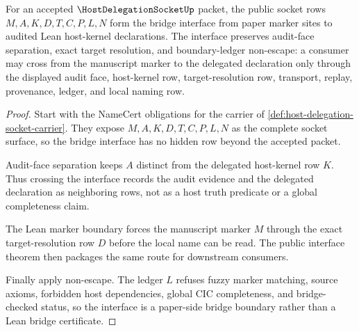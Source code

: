 \begin{theorem}
\label{thm:host-delegation-socket-bridge-interface}
For an accepted $\HostDelegationSocketUp$ packet, the public socket rows $M,A,K,D,T,C,P,L,N$ form the bridge interface from paper marker sites to audited Lean host-kernel declarations. The interface preserves audit-face separation, exact target resolution, and boundary-ledger non-escape: a consumer may cross from the manuscript marker to the delegated declaration only through the displayed audit face, host-kernel row, target-resolution row, transport, replay, provenance, ledger, and local naming row.
\end{theorem}
\begin{proof}
Start with the NameCert obligations for the carrier of \autoref{def:host-delegation-socket-carrier}. They expose $M,A,K,D,T,C,P,L,N$ as the complete socket surface, so the bridge interface has no hidden row beyond the accepted packet.

Audit-face separation keeps $A$ distinct from the delegated host-kernel row $K$. Thus crossing the interface records the audit evidence and the delegated declaration as neighboring rows, not as a host truth predicate or a global completeness claim.

The Lean marker boundary forces the manuscript marker $M$ through the exact target-resolution row $D$ before the local name can be read. The public interface theorem then packages the same route for downstream consumers.

Finally apply non-escape. The ledger $L$ refuses fuzzy marker matching, source axioms, forbidden host dependencies, global CIC completeness, and bridge-checked status, so the interface is a paper-side bridge boundary rather than a Lean bridge certificate.
\end{proof}

